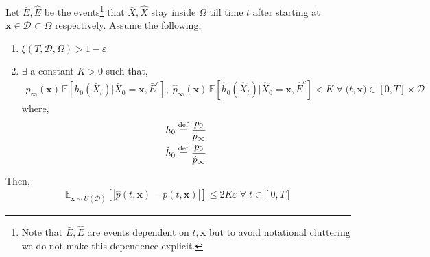 \begin{prop}Let $\bar E, \hat E$ be the events\footnote{Note that $\bar E, \hat E$ are events dependent on $t, \mathbf x$ but to avoid notational cluttering we do not make this dependence explicit.} that $\bar X, \hat X$ stay inside $\Omega$ till time $t$ after starting at $\mathbf x\in\mathcal D\subset\Omega$ respectively. Assume the following,
    \begin{enumerate}
    \item $\xi(T, \mathcal D, \Omega)>1-\varepsilon$
    
    \item $\exists$ a constant $K>0$ such that,
    \begin{align} 
     p_\infty(\mathbf x)\,\mathbb E[ h_0(\bar X_t)|\bar X_0=\mathbf x, \bar E^c],\;\hat p_\infty(\mathbf x)\,\mathbb E[\hat h_0(\hat X_t)|\hat X_0=\mathbf x, \hat E^c] < K \;\forall\;\mathbf (t,\mathbf x)\in[0, T]\times\mathcal D
    \end{align}
    where,\begin{align}
    &h_0 \stackrel{\rm def}{=} \frac{p_0}{p_\infty}\\
    &\hat h_0 \stackrel{\rm def}{=} \frac{p_0}{\hat p_\infty}
\end{align}
\end{enumerate}
Then, 
\begin{align}
    \mathbb E_{\mathbf x\sim U(\mathcal D)}[|\hat p(t, \mathbf x)-p(t, \mathbf x)|] \le 2K\varepsilon\;\forall\;t\in[0, T]
    \label{eq:pt-error--dynamic-fp}
\end{align}\label{prop:escape--dynamic-fp}
\end{prop}
